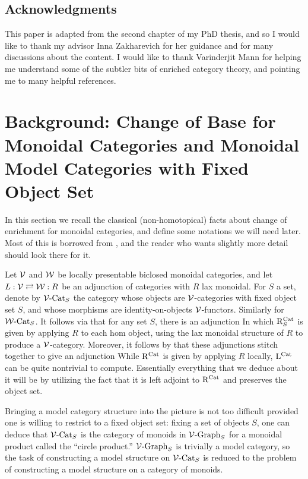 \documentclass[12pt]{amsart}
\begin{document}
\subsection*{Acknowledgments}
	This paper is adapted from the second chapter of my PhD thesis, and so I would like to thank my advisor Inna Zakharevich for her guidance and for many discussions about the content.
	I would like to thank Varinderjit Mann for helping me understand some of the subtler bits of enriched category theory, and pointing me to many helpful references.
\section{Background: Change of Base for Monoidal Categories and Monoidal Model Categories with Fixed Object Set}
\label{section:background}
In this section we recall the classical (non-homotopical) facts about change of enrichment for monoidal categories, and define some notations we will need later. 
Most of this is borrowed from \cite[Sections 2,3]{Muro2012}, and the reader who wants slightly more detail should look there for it.
\par 
Let $\mathcal{V}$ and $\mathcal{W}$ be locally presentable biclosed monoidal categories, and let $L: \mathcal{V} \rightleftarrows \mathcal{W} : R$ be an adjunction of categories with $R$ lax monoidal. 
For $S$ a set, denote by $\mathcal{V}\text{-}\mathrm{Cat}_S$ the category whose objects are $\mathcal{V}$-categories with fixed object set $S$, and whose morphisms are identity-on-objects $\mathcal{V}$-functors. Similarly for $\mathcal{W}\text{-}\mathrm{Cat}_S$.
It follows via \cite[Theorem 4.5.6]{Borceux1994} that for any set $S$, there is an adjunction 
In which $\mathrm{R}^{\mathrm{Cat}}_S$ is given by applying $R$ to each hom object, using the lax monoidal structure of $R$ to produce a $\mathcal{V}$-category. 
Moreover, it follows by \cite[Corollary 1.11.3]{Giraud1971} that these adjunctions stitch together to give an adjunction
\adjunctiondiagram{\lcat}{\vcat}{\wcat}{\rcat}
While $\mathrm{R}^{\mathrm{Cat}}$ is given by applying $R$ locally, $\mathrm{L}^{\mathrm{Cat}}$ can be quite nontrivial to compute.
Essentially everything that we deduce about it will be by utilizing the fact that it is left adjoint to $\mathrm{R}^{\mathrm{Cat}}$ and preserves the object set.
\par 
Bringing a model category structure into the picture is not too difficult provided one is willing to restrict to a fixed object set:
fixing a set of objects $S$, one can deduce that $\mathcal{V}\text{-}\mathrm{Cat}_S$ is the category of monoids in $\mathcal{V}\text{-}\mathrm{Graph}_S$ for a monoidal product called the ``circle product.''
$\mathcal{V}\text{-}\mathrm{Graph}_S$ is trivially a model category, so the task of constructing a model structure on $\mathcal{V}\text{-}\mathrm{Cat}_S$ is reduced to the problem of constructing a model structure on a category of monoids. 
\end{document}
